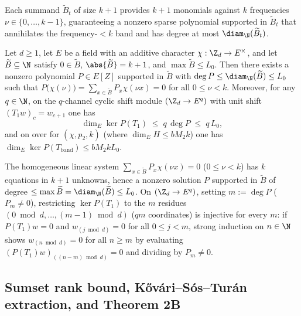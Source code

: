 Each summand $\widetilde{B}_t$ of size $k + 1$ provides $k + 1$ monomials against $k$ frequencies
$\nu \in \{0, \dots, k-1\}$, guaranteeing a nonzero sparse polynomial supported in $\widetilde{B}_t$
that annihilates the frequency-$< k$ band and has degree at most $\diam_{\N}(\widetilde{B}_t)$.

\begin{lemma}\label{lem:sumset-poly}
Let $d \ge 1$, let $E$ be a field with an additive character $\chi : \Z_d \to E^\times$, and
let $\widetilde{B} \subseteq \N$ satisfy $0 \in \widetilde{B}$, $\abs{\widetilde{B}} = k + 1$, and
$\max \widetilde{B} \le L_0$. Then there exists a nonzero polynomial $P \in E[Z]$ supported in
$\widetilde{B}$ with $\deg P \le \diam_{\N}(\widetilde{B}) \le L_0$ such that
$P\bigl(\chi(\nu)\bigr) = \sum_{x \in \widetilde{B}} P_x \chi(\nu x) = 0$ for all $0 \le \nu < k$.
Moreover, for any $q \in \N$, on the $q$-channel cyclic shift module $(\Z_d \to E^q)$ with unit shift
$(T_1 w)_c = w_{c+1}$ one has
\[
  \dim_E \ker P(T_1) \;\le\; q\,\deg P \;\le\; q\,L_0,
\]
and on  over  for
$(\chi, p_2, k)$ (where $\dim_E H \le b M_2 k$) one has
$\dim_E \ker P(T_{\mathrm{band}}) \le b M_2 k L_0$.
\end{lemma}
\begin{outline}
The homogeneous linear system $\sum_{x \in \widetilde{B}} P_x \chi(\nu x) = 0$ ($0 \le \nu < k$) has
$k$ equations in $k + 1$ unknowns, hence a nonzero solution $P$ supported in $\widetilde{B}$ of
degree $\le \max\widetilde{B} = \diam_{\N}(\widetilde{B}) \le L_0$. On $(\Z_d \to E^q)$, setting
$m := \deg P$ ($P_m \ne 0$), restricting $\ker P(T_1)$ to the $m$ residues
$(0 \bmod d, \dots, (m - 1) \bmod d)$ ($q m$ coordinates) is injective for every $m$: if
$P(T_1)w = 0$ and $w_{(j \bmod d)} = 0$ for all $0 \le j < m$, strong induction on $n \in \N$ shows
$w_{(n \bmod d)} = 0$ for all $n \ge m$ by evaluating $(P(T_1)w)_{((n - m) \bmod d)} = 0$ and
dividing by $P_m \ne 0$.
\end{outline}

\subsection{Sumset rank bound, K\H{o}v\'ari--S\'os--Tur\'an extraction, and Theorem 2B}\label{sec:thm2b}

